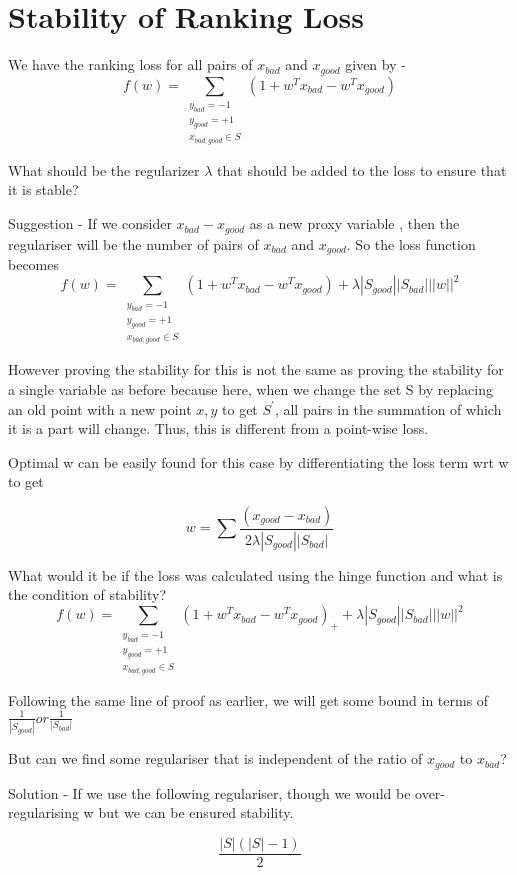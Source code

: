 
\section{Stability of Ranking Loss}
We have the ranking loss for all pairs of $x_{bad}$ and $x_{good}$ given by -
$${f(w) = \sum_{\substack{y_{bad}=-1 \\ y_{good}=+1 \\ x_{bad,good}\in S}}( 1 + w^{T}x_{bad} -  w^{T}x_{good})}$$

What should be the regularizer $\lambda$ that should be added to the loss to ensure that it is stable?

Suggestion - If we consider $x_{bad} - x_{good}$ as a new proxy variable , then the regulariser will be the number of pairs of $x_{bad}$ and $x_{good}$. So the loss function becomes
$${f(w) = \sum_{\substack{y_{bad}=-1 \\ y_{good}=+1 \\ x_{bad,good}\in S}}( 1 + w^{T}x_{bad} -  w^{T}x_{good}) + \lambda |S_{good}||S_{bad}|||w||^2}$$

However proving the stability for this is not the same as proving the stability for a single variable as before because here, when we change the set S by replacing an old point with a new point ${x,y}$ to get $S^{'}$, all pairs in the summation of which it is a part will change. Thus, this is different from a point-wise loss. 

Optimal w can be easily found for this case by differentiating the loss term wrt w to get

$${w = \sum\frac{(x_{good} - x_{bad})}{2\lambda|S_{good}||S_{bad}|}}$$

What would it be if the loss was calculated using the hinge function and what is the condition of stability?
$${f(w) = \sum_{\substack{y_{bad}=-1 \\ y_{good}=+1 \\ x_{bad,good}\in S}}( 1 + w^{T}x_{bad} -  w^{T}x_{good})_{+} + \lambda |S_{good}||S_{bad}|||w||^2}$$

Following the same line of proof as earlier, we will get some bound in terms of ${\frac{1}{|S_{good}|} or \frac{1}{|S_{bad}|}}$

But can we find some regulariser that is independent of the ratio of $x_{good}$ to $x_{bad}$?

Solution - If we use the following regulariser, though we would be over-regularising w but we can be ensured stability.

$${\frac {|S|(|S|-1)}{2}}$$